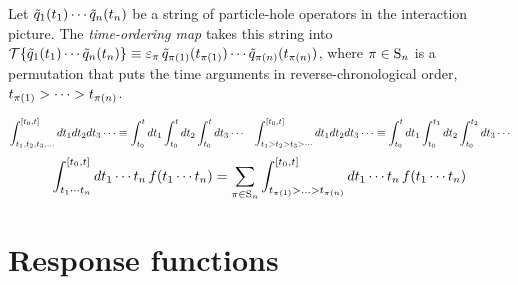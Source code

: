 \documentclass[11pt]{article}
\numberwithin{equation}{section}
\begin{document}
\begin{dfn}
Let 
$
  \tilde{q}_1(t_1)\cdots \tilde{q}_n(t_n)
$
be a string of particle-hole operators in the interaction picture.\footnotemark
{}
The \textit{time-ordering map} takes this string into
$
  \mc{T}\{
  \tl{q}_1(t_1)\cd \tl{q}_n(t_n)
  \}
\equiv
  \e_\pi \,\tl{q}_{\pi(1)}(t_{\pi(1)})\cd \tl{q}_{\pi(n)}(t_{\pi(n)})
$,
where $\pi\in\mr{S}_n$ is a permutation that puts the time arguments in reverse-chronological order, $t_{\pi(1)}>\cd>t_{\pi(n)}$.
\end{dfn}

\begin{ntt}
\begin{align}
  \int_{t_1,t_2,t_3,\ldots}^{[t_0,t]}
  dt_1dt_2dt_3\cdots
\equiv
  \int_{t_0}^t
  dt_1
  \int_{t_0}^t
  dt_2
  \int_{t_0}^t
  dt_3
  \cdots
&&
  \int_{t_1>t_2>t_3>\cdots}^{[t_0,t]}
  dt_1dt_2dt_3\cdots
\equiv
  \int_{t_0}^t
  dt_1
  \int_{t_0}^{t_1}
  dt_2
  \int_{t_0}^{t_2}
  dt_3
  \cdots
\end{align}
\begin{align}
  \int_{t_1\cd t_n}^{[t_0,t]}
  dt_1\cd t_n\,
  f(t_1\cd t_n)
=
  \sum_{\pi\in\mr{S}_n}
  \int_{t_{\pi(1)}>\ld>t_{\pi(n)}}^{[t_0,t]}
  dt_1\cd t_n\,
  f(t_1\cd t_n)
\end{align}
\end{ntt}


\begin{prop}
\end{prop}



\newpage
\section{Response functions}
\end{document}
